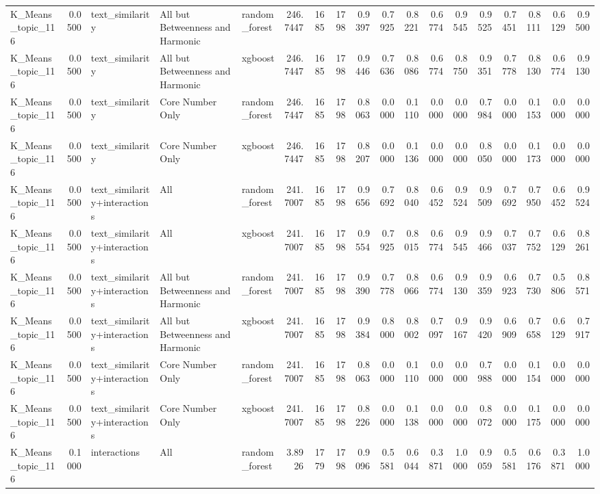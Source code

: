 \begin{tabular}{lrlllrrrrrrrrrrrrr}
K_Means_topic_116 & 0.0500 & text_similarity & All but Betweenness and Harmonic & random_forest & 246.7447 & 1685 & 1798 & 0.9397 & 0.7925 & 0.8221 & 0.6774 & 0.9545 & 0.9525 & 0.7451 & 0.8111 & 0.6129 & 0.9500 \\
K_Means_topic_116 & 0.0500 & text_similarity & All but Betweenness and Harmonic & xgboost & 246.7447 & 1685 & 1798 & 0.9446 & 0.7636 & 0.8086 & 0.6774 & 0.8750 & 0.9351 & 0.7778 & 0.8130 & 0.6774 & 0.9130 \\
K_Means_topic_116 & 0.0500 & text_similarity & Core Number Only & random_forest & 246.7447 & 1685 & 1798 & 0.8063 & 0.0000 & 0.1110 & 0.0000 & 0.0000 & 0.7984 & 0.0000 & 0.1153 & 0.0000 & 0.0000 \\
K_Means_topic_116 & 0.0500 & text_similarity & Core Number Only & xgboost & 246.7447 & 1685 & 1798 & 0.8207 & 0.0000 & 0.1136 & 0.0000 & 0.0000 & 0.8050 & 0.0000 & 0.1173 & 0.0000 & 0.0000 \\
K_Means_topic_116 & 0.0500 & text_similarity+interactions & All & random_forest & 241.7007 & 1685 & 1798 & 0.9656 & 0.7692 & 0.8040 & 0.6452 & 0.9524 & 0.9509 & 0.7692 & 0.7950 & 0.6452 & 0.9524 \\
K_Means_topic_116 & 0.0500 & text_similarity+interactions & All & xgboost & 241.7007 & 1685 & 1798 & 0.9554 & 0.7925 & 0.8015 & 0.6774 & 0.9545 & 0.9466 & 0.7037 & 0.7752 & 0.6129 & 0.8261 \\
K_Means_topic_116 & 0.0500 & text_similarity+interactions & All but Betweenness and Harmonic & random_forest & 241.7007 & 1685 & 1798 & 0.9390 & 0.7778 & 0.8066 & 0.6774 & 0.9130 & 0.9359 & 0.6923 & 0.7730 & 0.5806 & 0.8571 \\
K_Means_topic_116 & 0.0500 & text_similarity+interactions & All but Betweenness and Harmonic & xgboost & 241.7007 & 1685 & 1798 & 0.9384 & 0.8000 & 0.8002 & 0.7097 & 0.9167 & 0.9420 & 0.6909 & 0.7658 & 0.6129 & 0.7917 \\
K_Means_topic_116 & 0.0500 & text_similarity+interactions & Core Number Only & random_forest & 241.7007 & 1685 & 1798 & 0.8063 & 0.0000 & 0.1110 & 0.0000 & 0.0000 & 0.7988 & 0.0000 & 0.1154 & 0.0000 & 0.0000 \\
K_Means_topic_116 & 0.0500 & text_similarity+interactions & Core Number Only & xgboost & 241.7007 & 1685 & 1798 & 0.8226 & 0.0000 & 0.1138 & 0.0000 & 0.0000 & 0.8072 & 0.0000 & 0.1175 & 0.0000 & 0.0000 \\
K_Means_topic_116 & 0.1000 & interactions & All & random_forest & 3.8926 & 1779 & 1798 & 0.9096 & 0.5581 & 0.6044 & 0.3871 & 1.0000 & 0.9059 & 0.5581 & 0.6176 & 0.3871 & 1.0000 \\

\end{tabular}

